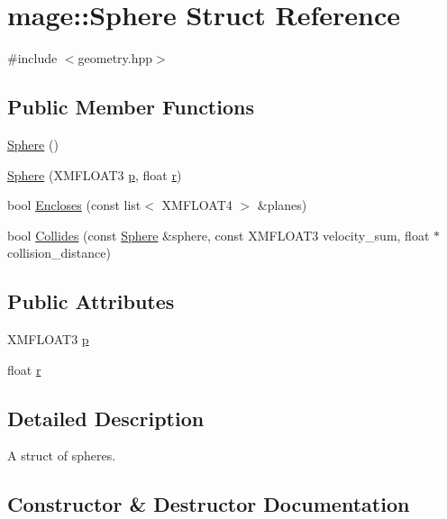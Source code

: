 \hypertarget{structmage_1_1_sphere}{}\section{mage\+:\+:Sphere Struct Reference}
\label{structmage_1_1_sphere}


{\ttfamily \#include $<$geometry.\+hpp$>$}

\subsection*{Public Member Functions}
\begin{DoxyCompactItemize}
\item 
\hyperlink{structmage_1_1_sphere_a65bbd9465f6e42b22f3f522ed7053758}{Sphere} ()
\item 
\hyperlink{structmage_1_1_sphere_a8b0d8c45a933c4863cd0727c5ef00b23}{Sphere} (X\+M\+F\+L\+O\+A\+T3 \hyperlink{structmage_1_1_sphere_a3eaad90e13e18fe66a5f927a40e4a96b}{p}, float \hyperlink{structmage_1_1_sphere_af9121b33471e72b3df2fb032f5f68151}{r})
\item 
bool \hyperlink{structmage_1_1_sphere_aa14f6b1e00c93186bae9f5b749d2b7f0}{Encloses} (const list$<$ X\+M\+F\+L\+O\+A\+T4 $>$ \&planes)
\item 
bool \hyperlink{structmage_1_1_sphere_a0f19a650a33b855d0e49000d0a508838}{Collides} (const \hyperlink{structmage_1_1_sphere}{Sphere} \&sphere, const X\+M\+F\+L\+O\+A\+T3 velocity\+\_\+sum, float $\ast$collision\+\_\+distance)
\end{DoxyCompactItemize}
\subsection*{Public Attributes}
\begin{DoxyCompactItemize}
\item 
X\+M\+F\+L\+O\+A\+T3 \hyperlink{structmage_1_1_sphere_a3eaad90e13e18fe66a5f927a40e4a96b}{p}
\item 
float \hyperlink{structmage_1_1_sphere_af9121b33471e72b3df2fb032f5f68151}{r}
\end{DoxyCompactItemize}


\subsection{Detailed Description}
A struct of spheres. 

\subsection{Constructor \& Destructor Documentation}
\hypertarget{structmage_1_1_sphere_a65bbd9465f6e42b22f3f522ed7053758}{}\label{structmage_1_1_sphere_a65bbd9465f6e42b22f3f522ed7053758} 
